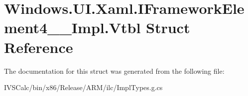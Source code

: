 \hypertarget{struct_windows_1_1_u_i_1_1_xaml_1_1_i_framework_element4_____impl_1_1_vtbl}{}\section{Windows.\+U\+I.\+Xaml.\+I\+Framework\+Element4\+\_\+\+\_\+\+Impl.\+Vtbl Struct Reference}
\label{struct_windows_1_1_u_i_1_1_xaml_1_1_i_framework_element4_____impl_1_1_vtbl}


The documentation for this struct was generated from the following file\+:\begin{DoxyCompactItemize}
\item 
I\+V\+S\+Calc/bin/x86/\+Release/\+A\+R\+M/ilc/Impl\+Types.\+g.\+cs\end{DoxyCompactItemize}
